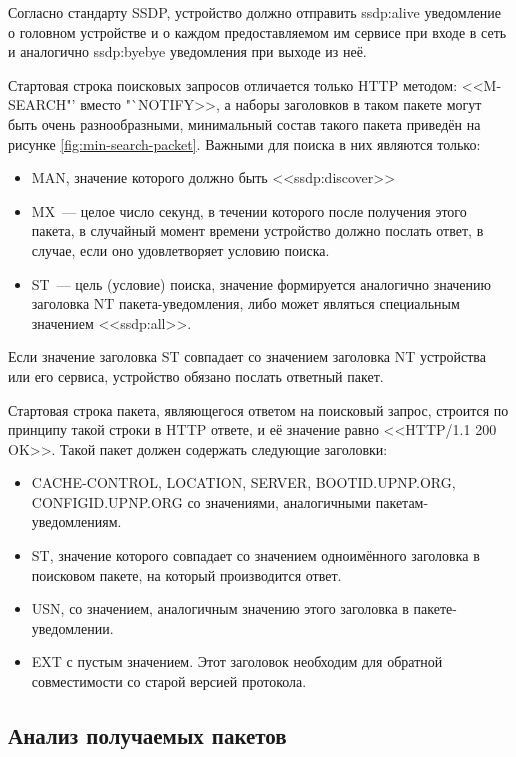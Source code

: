 Согласно стандарту SSDP, устройство должно отправить ssdp:alive уведомление о головном устройстве и о каждом предоставляемом им сервисе при входе в сеть и аналогично ssdp:byebye уведомления при выходе из неё.

Стартовая строка поисковых запросов отличается только HTTP методом: <<M-SEARCH"' вместо "`NOTIFY>>, а наборы заголовков в таком пакете могут быть очень разнообразными, минимальный состав такого пакета приведён на рисунке \ref{fig:min-search-packet}.
Важными для поиска в них являются только:

\begin{itemize}
	\item MAN, значение которого должно быть <<ssdp:discover>>
	\item MX~--- целое число секунд, в течении которого после получения этого пакета, в случайный момент времени устройство должно послать ответ, в случае, если оно удовлетворяет условию поиска.
	\item ST~--- цель (условие) поиска, значение формируется аналогично значению заголовка NT пакета-уведомления, либо может являться специальным значением <<ssdp:all>>.
\end{itemize}

Если значение заголовка ST совпадает со значением заголовка NT устройства или его сервиса, устройство обязано послать ответный пакет.


Стартовая строка пакета, являющегося ответом на поисковый запрос, строится по принципу такой строки в HTTP ответе, и её значение равно <<HTTP/1.1 200 OK>>.
Такой пакет должен содержать следующие заголовки:
\begin{itemize}
	\item CACHE-CONTROL, LOCATION, SERVER, BOOTID.UPNP.ORG, CONFIGID.UPNP.ORG со значениями, аналогичными пакетам-уведомлениям.
	\item ST, значение которого совпадает со значением одноимённого заголовка в поисковом пакете, на который производится ответ.
	\item USN, со значением, аналогичным значению этого заголовка в пакете-уведомлении.
	\item EXT с пустым значением.
Этот заголовок необходим для обратной совместимости со старой версией протокола.
\end{itemize}

\subsection{Анализ получаемых пакетов}


